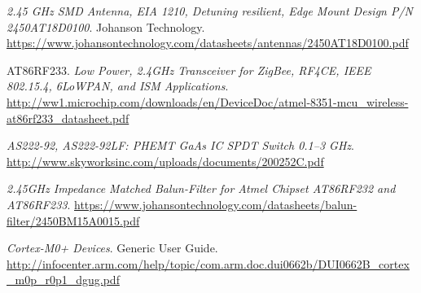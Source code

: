 \documentclass[12pt,a4paper]{report}
\begin{document}
\begin{thebibliography}{9}
\textit{2.45 GHz SMD Antenna, EIA 1210, Detuning resilient, Edge Mount Design P/N 2450AT18D0100}.
Johanson Technology.
\href{https://www.johansontechnology.com/datasheets/antennas/2450AT18D0100.pdf}{https://www.johansontechnology.com/datasheets/antennas/2450AT18D0100.pdf}

AT86RF233. 
\textit{Low Power, 2.4GHz Transceiver for ZigBee, RF4CE, IEEE 802.15.4, 6LoWPAN, and ISM Applications}.
\href{http://ww1.microchip.com/downloads/en/DeviceDoc/atmel-8351-mcu\_wireless-at86rf233\_datasheet.pdf}{http://ww1.microchip.com/downloads/en/DeviceDoc/atmel-8351-mcu\_wireless-at86rf233\_datasheet.pdf}

\textit{AS222-92, AS222-92LF: PHEMT GaAs IC SPDT Switch 0.1–3 GHz}.
\href{http://www.skyworksinc.com/uploads/documents/200252C.pdf}{http://www.skyworksinc.com/uploads/documents/200252C.pdf}

\textit{2.45GHz Impedance Matched Balun-Filter for Atmel Chipset AT86RF232 and AT86RF233}.
\href{https://www.johansontechnology.com/datasheets/balun-filter/2450BM15A0015.pdf}{https://www.johansontechnology.com/datasheets/balun-filter/2450BM15A0015.pdf}

\textit{Cortex-M0+ Devices}.
Generic User Guide.
\href{http://infocenter.arm.com/help/topic/com.arm.doc.dui0662b/DUI0662B\_cortex\_m0p\_r0p1\_dgug.pdf}{http://infocenter.arm.com/help/topic/com.arm.doc.dui0662b/DUI0662B\_cortex\_m0p\_r0p1\_dgug.pdf}


\end{thebibliography}
\end{document}
